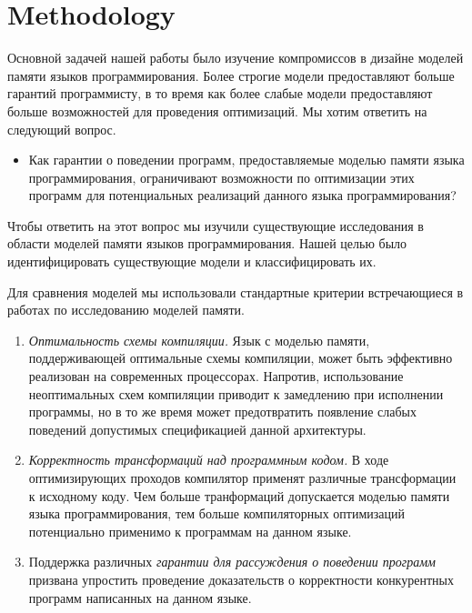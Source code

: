 \section{Methodology}
\label{sec:methodology}

Основной задачей нашей работы было изучение
компромиссов в дизайне моделей памяти 
языков программирования. 
Более строгие модели предоставляют больше гарантий программисту,
в то время как более слабые модели предоставляют 
больше возможностей для проведения оптимизаций. 
Мы хотим ответить на следующий вопрос. 

\begin{itemize}
  \item Как гарантии о поведении программ, 
    предоставляемые моделью памяти языка программирования, 
    ограничивают возможности по оптимизации этих программ
    для потенциальных реализаций данного языка программирования?
\end{itemize}

Чтобы ответить на этот вопрос мы изучили существующие исследования 
в области моделей памяти языков программирования.
Нашей целью было идентифицировать существующие модели и классифицировать их.

Для сравнения моделей мы использовали стандартные критерии
встречающиеся в работах по исследованию моделей памяти. 

\begin{enumerate}[label=\textbf{C.\arabic*}]
  
  \item \label{item:criteria:opt-comp}
    \emph{Оптимальность схемы компиляции.}
    Язык с моделью памяти, поддерживающей оптимальные 
    схемы компиляции, может быть эффективно реализован
    на современных процессорах. 
    Напротив, использование неоптимальных схем компиляции
    приводит к замедлению при исполнении программы, 
    но в то же время может предотвратить появление 
    слабых поведений допустимых спецификацией данной архитектуры. 

  \item \label{item:criteria:sound-trans}
    \emph{Корректность трансформаций над программным кодом.} 
    В ходе оптимизирующих проходов компилятор
    применят различные трансформации к исходному коду. 
    Чем больше транформаций допускается моделью памяти языка программирования, 
    тем больше компиляторных оптимизаций потенциально применимо 
    к программам на данном языке. 

  \item \label{item:criteria:reasoning}
    Поддержка различных \emph{гарантии для рассуждения о поведении программ}
    призвана упростить проведение доказательств о корректности 
    конкурентных программ написанных на данном языке. 
  
\end{enumerate}

